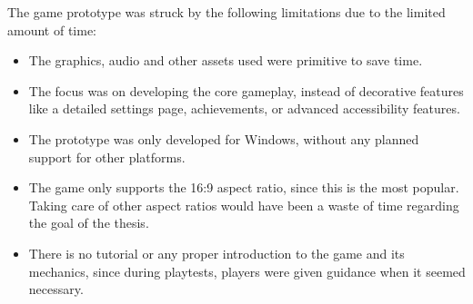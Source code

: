 The game prototype was struck by the following limitations due to the limited amount of time:

\begin{itemize}
    \item The graphics, audio and other assets used were primitive to save time.
    \item The focus was on developing the core gameplay, instead of decorative features like a detailed settings page, achievements, or advanced accessibility features.
    \item The prototype was only developed for Windows, without any planned support for other platforms.
    \item The game only supports the 16:9 aspect ratio, since this is the most popular. Taking care of other aspect ratios would have been a waste of time regarding the goal of the thesis.
    \item There is no tutorial or any proper introduction to the game and its mechanics, since during playtests, players were given guidance when it seemed necessary.

    
\end{itemize}